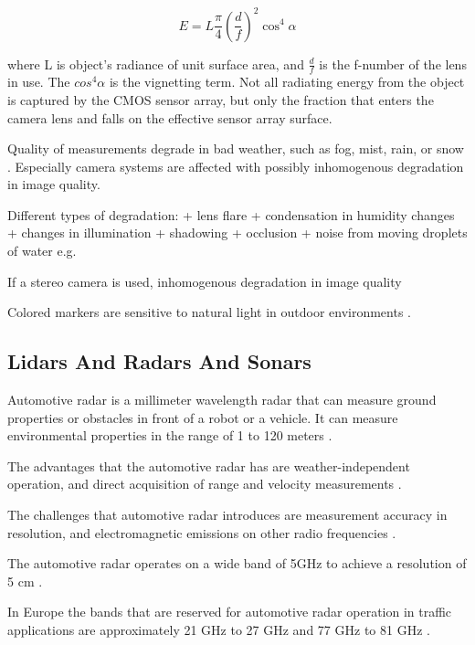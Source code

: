 \documentclass[12pt,a4paper,oneside,pdftex]{report}
\begin{document}
\begin{equation}
\label{equation:radiance}
E = L \frac{\pi}{4} (\frac{d}{f})^2 \cos^4{\alpha}
\end{equation}

where L is object's radiance of unit surface area, and $\frac{d}{f}$ is the f-number of the lens in use. The $cos^4{\alpha}$ is the vignetting term. Not all radiating energy from the object is captured by the CMOS sensor array, but only the fraction that enters the camera lens and falls on the effective sensor array surface.


Quality of measurements degrade in bad weather, such as fog, mist, rain, or snow \cite{Kawai12}. 
Especially camera systems are affected with possibly inhomogenous degradation in image quality.

Different types of degradation:
    + lens flare
    + condensation in humidity changes
    + changes in illumination
    + shadowing
    + occlusion
    + noise from moving droplets of water e.g.

If a stereo camera is used, inhomogenous degradation in image quality


Colored markers are sensitive to natural light in outdoor environments \cite{Kawai12}.

    
\subsection{Lidars And Radars And Sonars}
\label{subsection:lidars_and_radars_and_sonars}

Automotive radar is a millimeter wavelength radar that can measure ground properties or obstacles in front of a robot or a vehicle. It can measure environmental properties in the range of 1 to 120 meters \cite{Ahtiainen12}.

The advantages that the automotive radar has are weather-independent operation, and direct acquisition of range and velocity measurements \cite{Wenger07}.

The challenges that automotive radar introduces are measurement accuracy in resolution, and electromagnetic emissions on other radio frequencies \cite{Wenger07}. 

The automotive radar operates on a wide band of 5GHz to achieve a resolution of 5 cm \cite{Wenger07}.

In Europe the bands that are reserved for automotive radar operation in traffic applications are approximately 21 GHz to 27 GHz and 77 GHz to 81 GHz \cite{Wenger07}.
\end{document}
